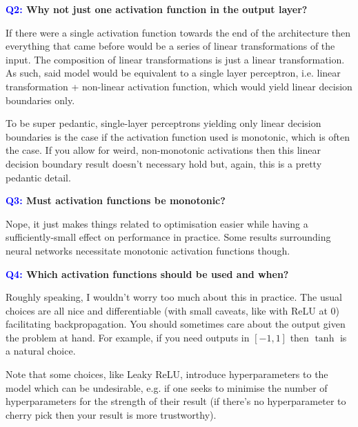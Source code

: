 \documentclass[11pt]{article}
\begin{document}
\begin{center}
    \textbf{\textcolor{blue}{Q2:} Why not just one activation function in the output layer?}
\end{center}
If there were a single activation function towards the end of the architecture then everything that came before would be a series of linear transformations of the input. The composition of linear transformations is just a linear transformation. As such, said model would be equivalent to a single layer perceptron, i.e. linear transformation + non-linear activation function, which would yield linear decision boundaries only.

To be super pedantic, single-layer perceptrons yielding only linear decision boundaries is the case if the activation function used is monotonic, which is often the case. If you allow for weird, non-monotonic activations then this linear decision boundary result doesn't necessary hold but, again, this is a pretty pedantic detail.

\begin{center}
    \textbf{\textcolor{blue}{Q3:} Must activation functions be monotonic?}
\end{center}
Nope, it just makes things related to optimisation easier while having a sufficiently-small effect on performance in practice. Some results surrounding neural networks necessitate monotonic activation functions though.

\begin{center}
    \textbf{\textcolor{blue}{Q4:} Which activation functions should be used and when?}
\end{center}
Roughly speaking, I wouldn't worry too much about this in practice. The usual choices are all nice and differentiable (with small caveats, like with ReLU at 0) facilitating backpropagation. You should sometimes care about the output given the problem at hand. For example, if you need outputs in $[-1,1]$ then $\tanh$ is a natural choice.

Note that some choices, like Leaky ReLU, introduce hyperparameters to the model which can be undesirable, e.g. if one seeks to minimise the number of hyperparameters for the strength of their result (if there's no hyperparameter to cherry pick then your result is more trustworthy).
\end{document}
